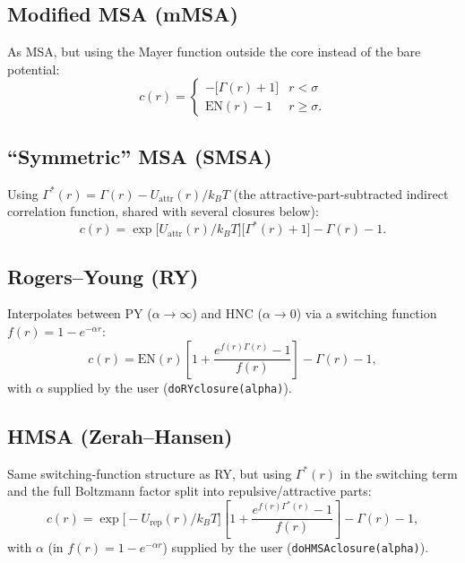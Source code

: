 \documentclass[11pt,a4paper]{article}
\newcommand{\code}[1]{\texttt{#1}}
\begin{document}
\subsection{Modified MSA (mMSA)}
As MSA, but using the Mayer function outside the core instead of the bare
potential:
\begin{equation}
  c(r) = \begin{cases} -\big[\Gamma(r)+1\big] & r<\sigma\\ \mathrm{EN}(r)-1 & r\ge\sigma. \end{cases}
\end{equation}

\subsection{``Symmetric'' MSA (SMSA)}
Using $\Gamma^*(r)=\Gamma(r)-U_{\mathrm{attr}}(r)/k_BT$ (the attractive-part-subtracted
indirect correlation function, shared with several closures below):
\begin{equation}
  c(r) = \exp\!\big[U_{\mathrm{attr}}(r)/k_BT\big]\big[\Gamma^*(r)+1\big] - \Gamma(r) - 1.
\end{equation}

\subsection{Rogers--Young (RY) \cite{RogersYoung1984}}
Interpolates between PY ($\alpha\to\infty$) and HNC ($\alpha\to0$) via a
switching function $f(r)=1-e^{-\alpha r}$:
\begin{equation}
  c(r) = \mathrm{EN}(r)\left[1+\frac{e^{f(r)\Gamma(r)}-1}{f(r)}\right] - \Gamma(r) - 1,
\end{equation}
with $\alpha$ supplied by the user (\code{doRYclosure(alpha)}).

\subsection{HMSA (Zerah--Hansen) \cite{ZerahHansen1986}}
Same switching-function structure as RY, but using $\Gamma^*(r)$ in the
switching term and the full Boltzmann factor split into repulsive/attractive
parts:
\begin{equation}
  c(r) = \exp\!\big[-U_{\mathrm{rep}}(r)/k_BT\big]\left[1+\frac{e^{f(r)\Gamma^*(r)}-1}{f(r)}\right] - \Gamma(r) - 1,
\end{equation}
with $\alpha$ (in $f(r)=1-e^{-\alpha r}$) supplied by the user
(\code{doHMSAclosure(alpha)}).
\end{document}
